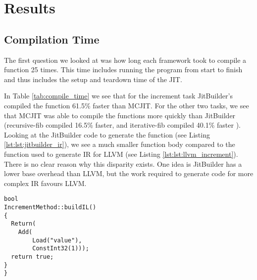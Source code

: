 \section{Results}
\label{sec:results}
\subsection{Compilation Time}
The first question we looked at was how long each framework took to compile a function 25 times. This time includes running the program from start to finish and thus includes the setup and teardown time of the JIT.

In Table \ref{tab:compile_time} we see that for the increment task JitBuilder's compiled the function 61.5\% faster than MCJIT.
For the other two tasks, we see that MCJIT was able to compile the functions more quickly than JitBuilder (recursive-fib compiled 16.5\% faster, and iterative-fib compiled 40.1\% faster ).
Looking at the JitBuilder code to generate the function (see Listing \ref{lst:lst:jitbuilder_ir}), we see a much smaller function body compared to the function used to generate IR for LLVM (see Listing \ref{lst:lst:llvm_increment}).
There is no clear reason why this disparity exists.
One idea is JitBuilder has a lower base overhead than LLVM, but the work required to generate code for more complex IR favours LLVM.

\begin{lstlisting}[float,floatplacement=H,
caption={Generating JitBuilder IR for the increment program.},
label=lst:jitbuilder_increment]
bool
IncrementMethod::buildIL()
{
  Return(
    Add(
        Load("value"),
        ConstInt32(1)));
  return true;
}
}\end{lstlisting}


